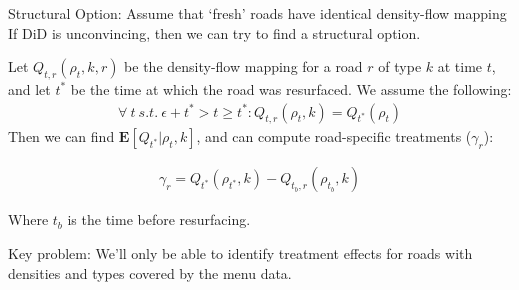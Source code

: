 \begin{frame}{Structural Option: Assume that `fresh' roads have identical density-flow mapping}
If DiD is unconvincing, then we can try to find a structural option.

Let $Q_{t,r} (\rho_t, k,r)$ be the density-flow mapping for a road $r$ of type $k$ at time $t$, and let $t^*$ be the time at which the road was resurfaced.
We assume the following:
\begin{align*}
    \forall \ t \ s.t. \ \epsilon+t^* >t \geq t^*: Q_{t,r}(\rho_t, k) = Q_{t^*}(\rho_t)
\end{align*}
Then we can find $\mathbf{E}[Q_{t^*}|\rho_t, k]$, and can compute road-specific treatments ($\gamma_r$):

\begin{align}
    \gamma_{r} =  Q_{t^*}(\rho_{t^*},k)-Q_{t_b,r}(\rho_{t_b}, k) 
\end{align}

Where $t_b$ is the time before resurfacing.

Key problem: We'll only be able to identify treatment effects for roads with densities and types covered by the menu data. 
\end{frame}
